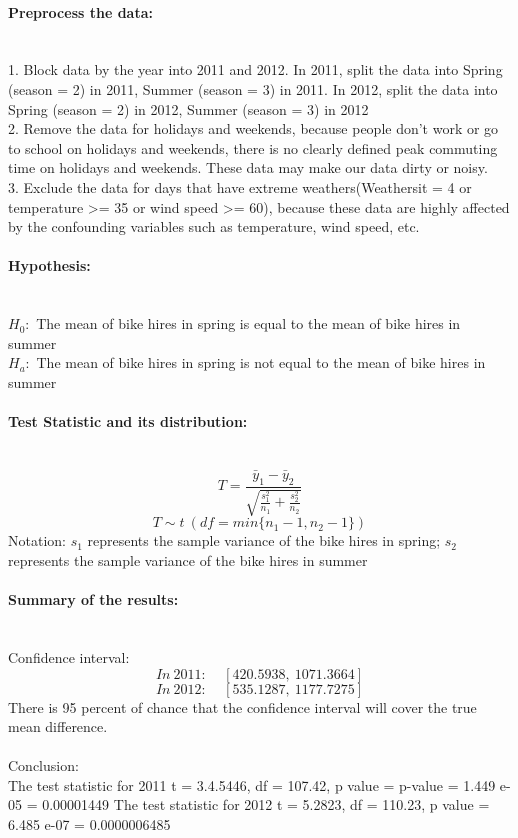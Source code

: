 \paragraph{Preprocess the data:} ~\\
1. Block data by the year into 2011 and 2012. In 2011, split the data into Spring (season = 2) in 2011, Summer (season = 3) in 2011. In 2012, split the data into Spring (season = 2) in 2012, Summer (season = 3) in 2012\\
2. Remove the data for holidays and weekends, because people don't work or go to school on holidays and weekends, there is no clearly defined peak commuting time on holidays and weekends. These data may make our data dirty or noisy.\\
3. Exclude the data for days that have extreme weathers(Weathersit = 4 or temperature >= 35 or wind speed >= 60), because these data are highly affected by the confounding variables such as temperature, wind speed, etc.\\

\paragraph{Hypothesis:} ~\\
$H_0:$ The mean of bike hires in spring is equal to the mean of bike hires in summer\\
$H_a:$ The mean of bike hires in spring is not equal to the mean of bike hires in summer
\paragraph{Test Statistic and its distribution:} ~\\
$$T = \frac{\bar{y}_1-\bar{y}_2}{\sqrt{\frac{s_1^2}{n_1}+\frac{s_2^2}{n_2}}}$$
$$T \sim t\ (df = min\{n_1-1,n_2-1\})$$
Notation: $s_1$ represents the sample variance of the bike hires in spring; $s_2$ represents the sample variance of the bike hires in summer
\paragraph{Summary of the results:} ~\\
Confidence interval:
$$In\ 2011:\ \ \ \ \  [420.5938,\ 1071.3664]$$
$$In\ 2012:\ \ \ \ \  [535.1287,\ 1177.7275]$$
There is 95 percent of chance that the confidence interval will cover the true mean difference. \\ \\
Conclusion: \\
The test statistic for 2011 t = 3.4.5446, df = 107.42, p value = p-value = 1.449 e-05 = 0.00001449
The test statistic for 2012 t = 5.2823, df = 110.23, p value = 6.485 e-07 = 0.0000006485

